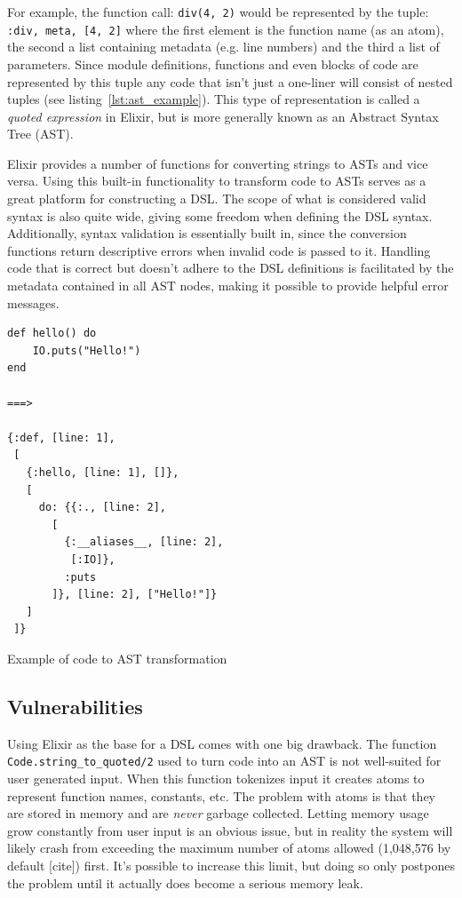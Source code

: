 
For example, the function call: \texttt{div(4, 2)} would be represented by the tuple: \texttt{{:div, meta, [4, 2]}}
where the first element is the function name (as an atom), the second a list containing metadata (e.g. line numbers) and the third a list of parameters. Since module definitions, functions and even blocks of code are represented by this tuple any code that isn't just a one-liner will consist of nested tuples (see listing~\ref{lst:ast_example}). This type of representation is called a \textit{quoted expression} in Elixir, but is more generally known as an Abstract Syntax Tree (AST).

Elixir provides a number of functions for converting strings to ASTs and vice versa. Using this built-in functionality to transform code to ASTs serves as a great platform for constructing a DSL. The scope of what is considered valid syntax is also quite wide, giving some freedom when defining the DSL syntax. Additionally, syntax validation is essentially built in, since the conversion functions return descriptive errors when invalid code is passed to it. Handling code that is correct but doesn't adhere to the DSL definitions is facilitated by the metadata contained in all AST nodes, making it possible to provide helpful error messages.  

\begin{listing}
\begin{verbatim}
def hello() do
    IO.puts("Hello!")
end

===>

{:def, [line: 1],
 [
   {:hello, [line: 1], []},
   [
     do: {{:., [line: 2],
       [
         {:__aliases__, [line: 2],
          [:IO]},
         :puts
       ]}, [line: 2], ["Hello!"]}
   ]
 ]}
\end{verbatim}
\caption{Example of code to AST transformation}
\label{lst:ast_example}
\end{listing}


\subsection{Vulnerabilities}
Using Elixir as the base for a DSL comes with one big drawback. The function \texttt{Code.string_to_quoted/2} used to turn code into an AST is not well-suited for user generated input. When this function tokenizes input it creates atoms to represent function names, constants, etc. The problem with atoms is that they are stored in memory and are \textit{never} garbage collected. Letting memory usage grow constantly from user input is an obvious issue, but in reality the system will likely crash from exceeding the maximum number of atoms allowed (1,048,576 by default [cite]) first. It's possible to increase this limit, but doing so only postpones the problem until it actually does become a serious memory leak.

